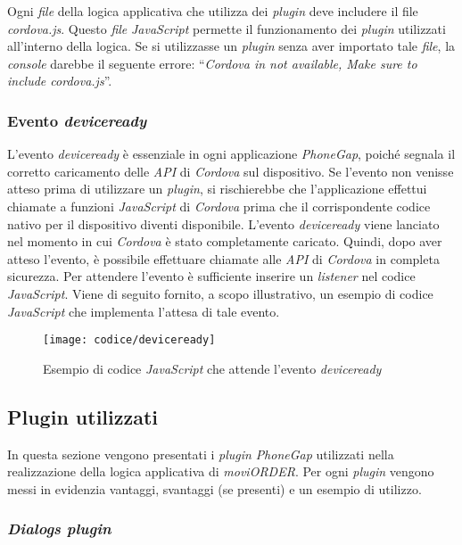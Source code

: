 Ogni \textit{file} della logica applicativa che utilizza dei \textit{plugin} deve includere il file \textit{cordova.js}. Questo \textit{file} \textit{JavaScript} permette il funzionamento dei \textit{plugin} utilizzati all'interno della logica. Se si utilizzasse un \textit{plugin} senza aver importato tale \textit{file}, la \textit{console} darebbe il seguente errore: ``\textit{Cordova in not available, Make sure to include cordova.js}''.

\subsubsection{Evento \textit{deviceready}}

L'evento \textit{deviceready} è essenziale in ogni applicazione \textit{PhoneGap}, poiché segnala il corretto caricamento delle \textit{API} di \textit{Cordova} sul dispositivo. Se l'evento non venisse atteso prima di utilizzare un \textit{plugin}, si rischierebbe che l'applicazione effettui chiamate a funzioni \textit{JavaScript} di \textit{Cordova} prima che il corrispondente codice nativo per il dispositivo diventi disponibile. L'evento \textit{deviceready} viene lanciato nel momento in cui \textit{Cordova} è stato completamente caricato. Quindi, dopo aver atteso l'evento, è possibile effettuare chiamate alle \textit{API} di \textit{Cordova} in completa sicurezza. Per attendere l'evento è sufficiente inserire un \textit{listener} nel codice \textit{JavaScript}. Viene di seguito fornito, a scopo illustrativo, un esempio di codice \textit{JavaScript} che implementa l'attesa di tale evento.

\begin{figure}[!h] 
    \centering 
    \texttt{[image: codice/deviceready]} 
    \caption{Esempio di codice \textit{JavaScript} che attende l'evento \textit{deviceready}}
\end{figure}

\subsection{Plugin utilizzati}

In questa sezione vengono presentati i \textit{plugin} \textit{PhoneGap} utilizzati nella realizzazione della logica applicativa di \textit{moviORDER}. Per ogni \textit{plugin} vengono messi in evidenzia vantaggi, svantaggi (se presenti) e un esempio di utilizzo.

\subsubsection{\textit{Dialogs plugin}}

